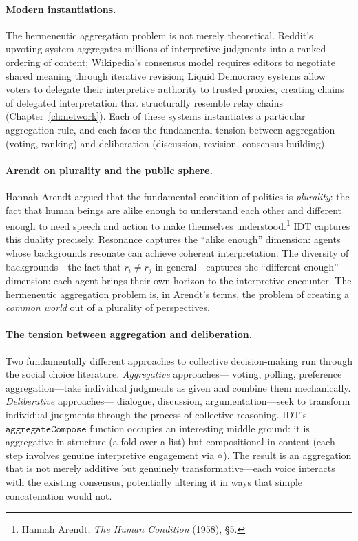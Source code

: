 \paragraph{Modern instantiations.}
The hermeneutic aggregation problem is not merely theoretical.  Reddit's
upvoting system aggregates millions of interpretive judgments into a
ranked ordering of content; Wikipedia's consensus model requires editors
to negotiate shared meaning through iterative revision; Liquid Democracy
systems allow voters to delegate their interpretive authority to trusted
proxies, creating chains of delegated interpretation that structurally
resemble relay chains (Chapter~\ref{ch:network}).  Each of these systems
instantiates a particular aggregation rule, and each faces the fundamental
tension between aggregation (voting, ranking) and deliberation (discussion,
revision, consensus-building).

\paragraph{Arendt on plurality and the public sphere.}
Hannah Arendt argued that the fundamental condition of politics is
\emph{plurality}: the fact that human beings are alike enough to understand
each other and different enough to need speech and action to make themselves
understood.\footnote{Hannah Arendt, \textit{The Human Condition} (1958),
\S5.}  IDT captures this duality precisely.  Resonance captures the
``alike enough'' dimension: agents whose backgrounds resonate can achieve
coherent interpretation.  The diversity of backgrounds---the fact that
$r_i \neq r_j$ in general---captures the ``different enough'' dimension:
each agent brings their own horizon to the interpretive encounter.  The
hermeneutic aggregation problem is, in Arendt's terms, the problem of
creating a \emph{common world} out of a plurality of perspectives.

\paragraph{The tension between aggregation and deliberation.}
Two fundamentally different approaches to collective decision-making run
through the social choice literature.  \emph{Aggregative} approaches---
voting, polling, preference aggregation---take individual judgments as
given and combine them mechanically.  \emph{Deliberative} approaches---
dialogue, discussion, argumentation---seek to transform individual
judgments through the process of collective reasoning.  IDT's
$\texttt{aggregateCompose}$ function occupies an interesting middle ground:
it is aggregative in structure (a fold over a list) but compositional in
content (each step involves genuine interpretive engagement via
$\circ$).  The result is an aggregation that is not merely additive
but genuinely transformative---each voice interacts with the existing
consensus, potentially altering it in ways that simple concatenation
would not.

